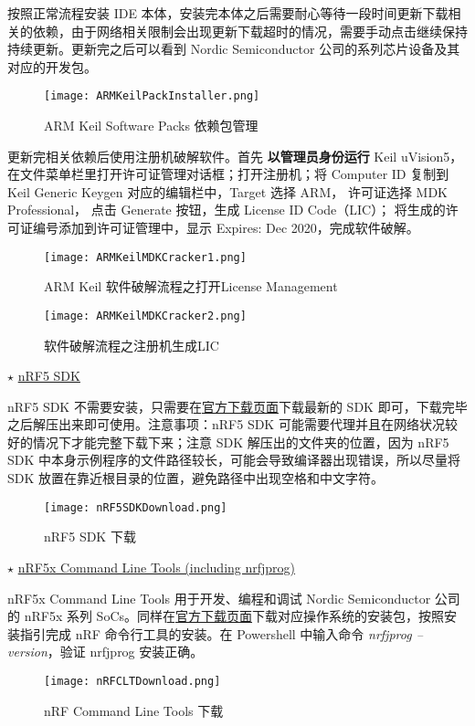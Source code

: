 \documentclass{WHUResearch}  %
\begin{document}
按照正常流程安装 IDE 本体，安装完本体之后需要耐心等待一段时间更新下载相关的依赖，由于网络相关限制会出现更新下载超时的情况，需要手动点击继续保持持续更新。更新完之后可以看到 Nordic Semiconductor 公司的系列芯片设备及其对应的开发包。
\begin{figure}[htbp]
\centering
  \texttt{[image: ARMKeilPackInstaller.png]}
  \caption{ARM Keil Software Packs 依赖包管理}
  \label{fig:ARMKeilPackInstaller}
\end{figure}

更新完相关依赖后使用注册机破解软件。首先 \textbf{以管理员身份运行} Keil uVision5，在文件菜单栏里打开许可证管理对话框；打开注册机；将 Computer ID 复制到 Keil Generic Keygen 对应的编辑栏中，Target 选择 ARM， 许可证选择 MDK Professional， 点击 Generate 按钮，生成 License ID Code（LIC）； 将生成的许可证编号添加到许可证管理中，显示 Expires: Dec 2020，完成软件破解。
\begin{figure}[htbp]
\centering
  \texttt{[image: ARMKeilMDKCracker1.png]}
  \caption{ARM Keil 软件破解流程之打开License Management}
  \label{fig:ARMKeilMDKCracker1}
\end{figure}
\begin{figure}[htbp]
\centering
  \texttt{[image: ARMKeilMDKCracker2.png]}
  \caption{软件破解流程之注册机生成LIC}
  \label{fig:ARMKeilMDKCracker2}
\end{figure}

$\star$ \href{https://developer.nordicsemi.com/}{nRF5 SDK}

nRF5 SDK 不需要安装，只需要在\href{https://www.nordicsemi.com/Software-and-Tools/Software/nRF5-SDK}{官方下载页面}下载最新的 SDK 即可，下载完毕之后解压出来即可使用。注意事项：nRF5 SDK 可能需要代理并且在网络状况较好的情况下才能完整下载下来；注意 SDK 解压出的文件夹的位置，因为 nRF5 SDK 中本身示例程序的文件路径较长，可能会导致编译器出现错误，所以尽量将 SDK 放置在靠近根目录的位置，避免路径中出现空格和中文字符。
\begin{figure}[htbp]
\centering
  \texttt{[image: nRF5SDKDownload.png]}
  \caption{nRF5 SDK 下载}
  \label{fig:nRF5SDKDownload}
\end{figure}

$\star$ \href{https://www.nordicsemi.com/Software-and-Tools/Development-Tools/nRF5-Command-Line-Tools/Download#infotabs}{nRF5x Command Line Tools (including nrfjprog)}

nRF5x Command Line Tools 用于开发、编程和调试 Nordic Semiconductor 公司的 nRF5x 系列 SoCs。同样在\href{https://www.nordicsemi.com/Software-and-Tools/Development-Tools/nRF-Command-Line-Tools/Download}{官方下载页面}下载对应操作系统的安装包，按照安装指引完成 nRF 命令行工具的安装。在 Powershell 中输入命令 \textit{nrfjprog --version}，验证 nrfjprog 安装正确。
\begin{figure}[htbp]
\centering
  \texttt{[image: nRFCLTDownload.png]}
  \caption{nRF Command Line Tools 下载}
  \label{fig:nRFCLTDownload}
\end{figure}
\end{document}
